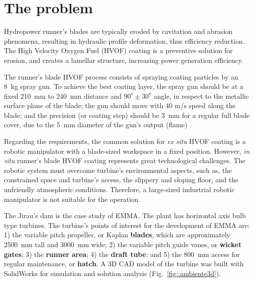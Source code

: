 \section{The problem}\label{problem}



Hydropower runner's blades are typically eroded by cavitation and abrasion
phenomena, resulting in hydraulic profile deformation, thus efficiency
reduction. The High Velocity Oxygen Fuel (HVOF) coating is a preventive
solution for erosion, and creates a lamellar structure, increasing
power generation efficiency. 

The runner's blade HVOF process consists of spraying coating particles
by an 8~kg spray gun. To achieve the best coating layer, the spray gun should be at a
fixed 210~mm to 240~mm distance and $90^o \pm 30^o$ angle, in respect
to the metallic surface plane of the blade; the gun should move with 40 m/s
speed along the blade; and the precision (or coating step) should be 3~mm for a
regular full blade cover, due to the 5~mm diameter of the gun's output (flame)
\cite{li2002effect}.

Regarding the requirements, the common solution for \textit{ex situ} HVOF
coating is a robotic manipulator with a blade-sized workspace in a fixed
position. However, \textit{in situ} runner's blade HVOF coating represents
great technological challenges. The robotic system must overcome
turbine's environmental aspects, such as, the constrained space and turbine's
access, the slippery and sloping floor, and the unfriendly atmospheric
conditions. Therefore, a large-sized industrial robotic manipulator is not
suitable for the operation.

The Jirau's dam is the case study of EMMA. The plant has horizontal
axis bulb type turbines. The turbine's points of interest for the
development of EMMA are: 1) the variable pitch propeller, or Kaplan
\textbf{blades}, which are approximately 2500~mm tall and 3000~mm wide; 2) the
variable pitch guide vanes, or \textbf{wicket gates}; 3) the \textbf{runner
area}; 4) the \textbf{draft tube}; and 5) the 800~mm access for regular
maintenance, or \textbf{hatch}. A 3D CAD model of the turbine was built with
SolidWorks\raisebox{1ex}{\textregistered} for simulation and solution analysis
(Fig.~\ref{fig::ambiente3d}).
 

